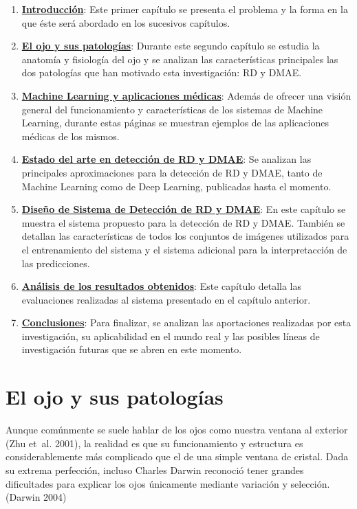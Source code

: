 \documentclass[
  12pt,
  spanish,
  a4paperpaper,
]{report}
\providecommand{\tightlist}{%
  \setlength{\itemsep}{0pt}\setlength{\parskip}{0pt}}
\begin{document}
\begin{enumerate}
\def\labelenumi{\arabic{enumi}.}
\tightlist
\item
  \textbf{\protect\hyperlink{intro}{Introducción}}: Este primer capítulo
  se presenta el problema y la forma en la que éste será abordado en los
  sucesivos capítulos.
\item
  \textbf{\protect\hyperlink{ojo}{El ojo y sus patologías}}: Durante
  este segundo capítulo se estudia la anatomía y fisiología del ojo y se
  analizan las características principales las dos patologías que han
  motivado esta investigación: RD y DMAE.
\item
  \textbf{\protect\hyperlink{ml}{Machine Learning y aplicaciones
  médicas}}: Además de ofrecer una visión general del funcionamiento y
  características de los sistemas de Machine Learning, durante estas
  páginas se muestran ejemplos de las aplicaciones médicas de los
  mismos.
\item
  \textbf{\protect\hyperlink{arte}{Estado del arte en detección de RD y
  DMAE}}: Se analizan las principales aproximaciones para la detección
  de RD y DMAE, tanto de Machine Learning como de Deep Learning,
  publicadas hasta el momento.
\item
  \textbf{\protect\hyperlink{sistema}{Diseño de Sistema de Detección de
  RD y DMAE}}: En este capítulo se muestra el sistema propuesto para la
  detección de RD y DMAE. También se detallan las características de
  todos los conjuntos de imágenes utilizados para el entrenamiento del
  sistema y el sistema adicional para la interpretacción de las
  predicciones.
\item
  \textbf{\protect\hyperlink{resultados}{Análisis de los resultados
  obtenidos}}: Este capítulo detalla las evaluaciones realizadas al
  sistema presentado en el capítulo anterior.
\item
  \textbf{\protect\hyperlink{conclusiones}{Conclusiones}}: Para
  finalizar, se analizan las aportaciones realizadas por esta
  investigación, su aplicabilidad en el mundo real y las posibles líneas
  de investigación futuras que se abren en este momento.
\end{enumerate}

\hypertarget{ojo}{%
\chapter{El ojo y sus patologías}\label{ojo}}

Aunque comúnmente se suele hablar de los ojos como nuestra ventana al
exterior (Zhu et~al. 2001), la realidad es que su funcionamiento y
estructura es considerablemente más complicado que el de una simple
ventana de cristal. Dada su extrema perfección, incluso Charles Darwin
reconoció tener grandes dificultades para explicar los ojos únicamente
mediante variación y selección. (Darwin 2004)
\end{document}
